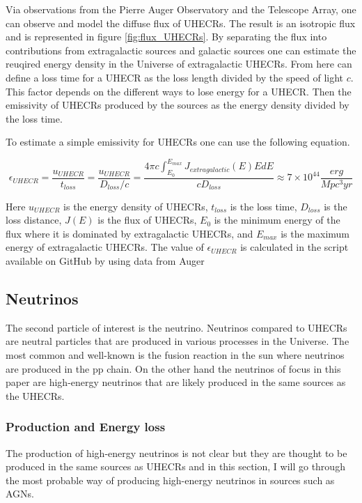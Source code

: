 \documentclass{article}
\begin{document}
Via observations from the Pierre Auger Observatory and the Telescope Array, one can observe and model the diffuse flux of UHECRs. The result is an isotropic flux and is represented in figure \ref{fig:flux_UHECRs}.  By separating the 
flux into contributions from extragalactic sources and galactic sources one can estimate the reuqired energy density in the Universe of extragalactic UHECRs. From here can define a loss time for a UHECR as the loss length divided by the speed of light $c$. This factor depends on the different ways to lose energy for a UHECR. Then the emissivity of UHECRs produced by the sources as the energy density divided by the loss time.

To estimate a simple emissivity for UHECRs one can use the following equation.

\begin{equation}
    \epsilon_{UHECR} = \frac{u_{UHECR}}{t_{loss}} = \frac{u_{UHECR}}{D_{loss}/c} = \frac{4\pi c \int_{E_0}^{E_{max}}J_{extragalactic}(E)E dE}{c D_{loss}} \approx 7\times 10^{44} \frac{erg}{Mpc^3 yr}
\end{equation}

Here $u_{UHECR}$ is the energy density of UHECRs, $t_{loss}$ is the loss time, $D_{loss}$ is the loss distance, $J(E)$ is the flux of UHECRs, $E_0$ is the minimum energy of the flux where it is dominated by extragalactic UHECRs, and $E_{max}$ is the maximum energy of extragalactic UHECRs.
The value of $\epsilon_{UHECR}$ is calculated in the script available on GitHub by using data from  Auger \cite{thepierreaugercollaboration2017pierre}


\subsection{Neutrinos}

The second particle of interest is the neutrino. Neutrinos compared to UHECRs are neutral particles that are produced in various processes in the Universe.
The most common and well-known is the fusion reaction in the sun where neutrinos are produced in the pp chain. On the other hand the neutrinos of focus in this paper 
are high-energy neutrinos that are likely produced in the same sources as the UHECRs.



\subsubsection{Production and Energy loss}
The production of high-energy neutrinos is not clear but they are thought to be produced in the same sources as UHECRs 
and in this section, I will go through the most probable way of producing high-energy neutrinos in sources such as AGNs.
\end{document}
